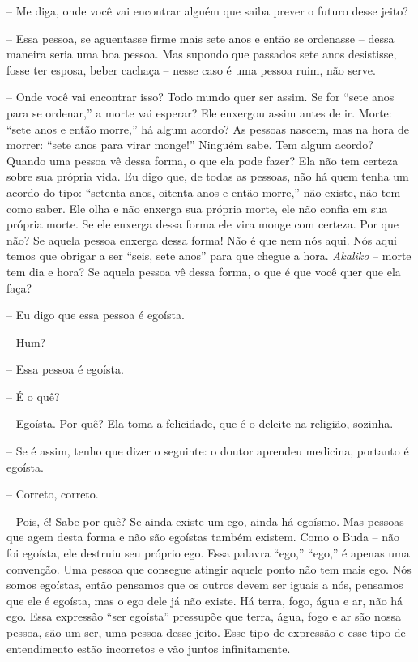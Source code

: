 -- Me diga, onde você vai encontrar alguém que saiba prever o
futuro desse jeito?

-- Essa pessoa, se aguentasse firme mais sete anos e então se
ordenasse – dessa maneira seria uma boa pessoa. Mas supondo que
passados sete anos desistisse, fosse ter esposa, beber cachaça – nesse
caso é uma pessoa ruim, não serve.

-- Onde você vai encontrar isso? Todo mundo quer ser assim. Se for
“sete anos para se ordenar,” a morte vai esperar? Ele enxergou assim
antes de ir. Morte: “sete anos e então morre,” há algum acordo? As
pessoas nascem, mas na hora de morrer: “sete anos para virar monge!”
Ninguém sabe. Tem algum acordo? Quando uma pessoa vê dessa forma, o que
ela pode fazer? Ela não tem certeza sobre sua própria vida. Eu digo
que, de todas as pessoas, não há quem tenha um acordo do tipo: “setenta
anos, oitenta anos e então morre,” não existe, não tem como saber. Ele
olha e não enxerga sua própria morte, ele não confia em sua própria
morte. Se ele enxerga dessa forma ele vira monge com certeza. Por que
não? Se aquela pessoa enxerga dessa forma! Não é que nem nós aqui. Nós
aqui temos que obrigar a ser “seis, sete anos” para que chegue a hora.
\textit{Akaliko} – morte tem dia e hora? Se aquela pessoa vê dessa
forma, o que é que você quer que ela faça? 

-- Eu digo que essa pessoa é egoísta. 

-- Hum?

-- Essa pessoa é egoísta.

-- É o quê?

-- Egoísta. Por quê? Ela toma a felicidade, que é o deleite na
religião, sozinha. 

-- Se é assim, tenho que dizer o seguinte: o doutor aprendeu
medicina, portanto é egoísta.

-- Correto, correto.

-- Pois, é! Sabe por quê? Se ainda existe um ego, ainda há egoísmo.
Mas pessoas que agem desta forma e não são egoístas também existem.
Como o Buda – não foi egoísta, ele destruiu seu próprio ego. Essa
palavra “ego,” “ego,” é apenas uma convenção. Uma pessoa que consegue
atingir aquele ponto não tem mais ego. Nós somos egoístas, então
pensamos que os outros devem ser iguais a nós, pensamos que ele é
egoísta, mas o ego dele já não existe. Há terra, fogo, água e ar, não
há ego. Essa expressão “ser egoísta” pressupõe que terra, água, fogo e
ar são nossa pessoa, são um ser, uma pessoa desse jeito. Esse tipo de
expressão e esse tipo de entendimento estão incorretos e vão juntos
infinitamente. 

